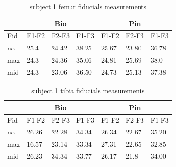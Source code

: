 \begin{table}[]
\centering
\begin{tabular}{ll|lll|lll|}
\cline{3-8}
            &             & \multicolumn{3}{c|}{Bio}                                                    & \multicolumn{3}{c|}{Pin}                                                    \\ \hline
\multicolumn{2}{|l|}{Fid} & \multicolumn{1}{l|}{F1-F2} & \multicolumn{1}{l|}{F2-F3} & F1-F3 & \multicolumn{1}{l|}{F1-F2} & \multicolumn{1}{l|}{F2-F3} & F1-F3 \\ \hline
\multicolumn{2}{|l|}{no}  & \multicolumn{1}{l|}{25.4}      & \multicolumn{1}{l|}{24.42}     & 38.25     & \multicolumn{1}{l|}{25.67}     & \multicolumn{1}{l|}{23.80}     & 36.78     \\ \hline
\multicolumn{2}{|l|}{max} & \multicolumn{1}{l|}{24.3}      & \multicolumn{1}{l|}{24.36}     & 35.06     & \multicolumn{1}{l|}{24.81}     & \multicolumn{1}{l|}{25.69}     & 38.0      \\ \hline
\multicolumn{2}{|l|}{mid} & \multicolumn{1}{l|}{24.3}      & \multicolumn{1}{l|}{23.06}     & 36.50     & \multicolumn{1}{l|}{24.73}     & \multicolumn{1}{l|}{25.13}     & 37.38     \\ \hline
\end{tabular}
\caption{subject 1 femur fiducials measurements }
\label{tab:sub1_femur}
\end{table}

\begin{table}[]
\centering
\begin{tabular}{ll|lll|lll|}
\cline{3-8}
            &             & \multicolumn{3}{c|}{Bio}                                                    & \multicolumn{3}{c|}{Pin}                                                    \\ \hline
\multicolumn{2}{|l|}{Fid} & \multicolumn{1}{l|}{F1-F2} & \multicolumn{1}{l|}{F2-F3} & F1-F3 & \multicolumn{1}{l|}{F1-F2} & \multicolumn{1}{l|}{F2-F3} & F1-F3 \\ \hline
\multicolumn{2}{|l|}{no}  & \multicolumn{1}{l|}{26.26}     & \multicolumn{1}{l|}{22.28}     & 34.34     & \multicolumn{1}{l|}{26.34}     & \multicolumn{1}{l|}{22.67}     & 35.20     \\ \hline
\multicolumn{2}{|l|}{max} & \multicolumn{1}{l|}{16.57}     & \multicolumn{1}{l|}{23.14}     & 33.34     & \multicolumn{1}{l|}{27.31}     & \multicolumn{1}{l|}{22.65}     & 32.85     \\ \hline
\multicolumn{2}{|l|}{mid} & \multicolumn{1}{l|}{26.23}     & \multicolumn{1}{l|}{34.34}     & 33.77     & \multicolumn{1}{l|}{26.17}     & \multicolumn{1}{l|}{21.8}      & 34.00     \\ \hline
\end{tabular}
\caption{subject 1 tibia fiducials measurements }
\label{tab:sub1_tibia}
\end{table}




